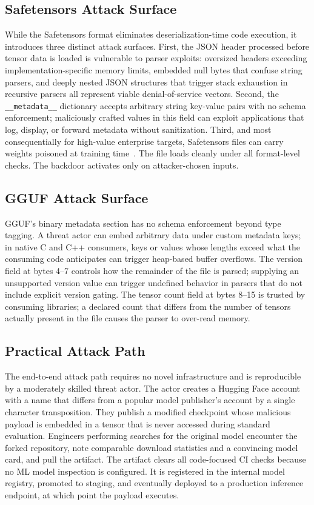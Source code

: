 \documentclass[sigconf,review]{acmart}
\begin{document}
\subsection{Safetensors Attack Surface}

While the Safetensors format eliminates deserialization-time code execution,
it introduces three distinct attack surfaces. First, the JSON header
processed before tensor data is loaded is vulnerable to parser exploits:
oversized headers exceeding implementation-specific memory limits, embedded
null bytes that confuse string parsers, and deeply nested JSON structures
that trigger stack exhaustion in recursive parsers all represent viable
denial-of-service vectors. Second, the \texttt{\_\_metadata\_\_} dictionary
accepts arbitrary string key-value pairs with no schema enforcement;
maliciously crafted values in this field can exploit applications that log,
display, or forward metadata without sanitization. Third, and most
consequentially for high-value enterprise targets, Safetensors files can
carry weights poisoned at training time~\cite{gu2019badnets}. The file loads
cleanly under all format-level checks. The backdoor activates only on
attacker-chosen inputs.

\subsection{GGUF Attack Surface}

GGUF's binary metadata section has no schema enforcement beyond type tagging.
A threat actor can embed arbitrary data under custom metadata keys; in native
C and C++ consumers, keys or values whose lengths exceed what the consuming
code anticipates can trigger heap-based buffer overflows. The version field
at bytes 4--7 controls how the remainder of the file is parsed; supplying an
unsupported version value can trigger undefined behavior in parsers that do
not include explicit version gating. The tensor count field at bytes 8--15
is trusted by consuming libraries; a declared count that differs from the
number of tensors actually present in the file causes the parser to
over-read memory.

\subsection{Practical Attack Path}

The end-to-end attack path requires no novel infrastructure and is
reproducible by a moderately skilled threat actor. The actor creates a
Hugging Face account with a name that differs from a popular model
publisher's account by a single character transposition. They publish a
modified checkpoint whose malicious payload is embedded in a tensor that is
never accessed during standard evaluation. Engineers performing searches for
the original model encounter the forked repository, note comparable download
statistics and a convincing model card, and pull the artifact. The artifact
clears all code-focused CI checks because no ML model inspection is
configured. It is registered in the internal model registry, promoted to
staging, and eventually deployed to a production inference endpoint, at
which point the payload executes.
\end{document}

